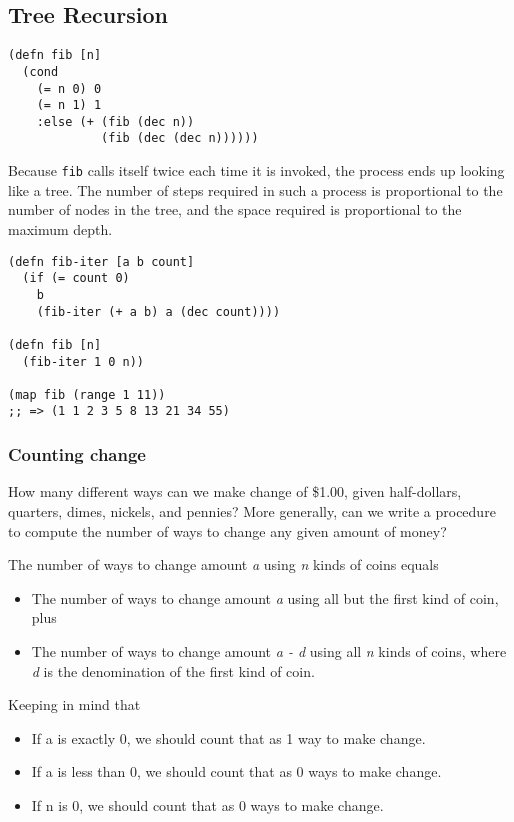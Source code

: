 \documentclass[11pt]{article}
\begin{document}
\subsection{Tree Recursion}
\label{sec-2-3}
\begin{verbatim}
(defn fib [n]
  (cond
    (= n 0) 0
    (= n 1) 1
    :else (+ (fib (dec n))
             (fib (dec (dec n))))))
\end{verbatim}

Because \texttt{fib} calls itself twice each time it is invoked, the process ends up looking like a tree. The number of steps required in such a process is proportional to the number of nodes in the tree, and the space required is proportional to the maximum depth.

\begin{verbatim}
(defn fib-iter [a b count]
  (if (= count 0)
    b
    (fib-iter (+ a b) a (dec count))))

(defn fib [n]
  (fib-iter 1 0 n))

(map fib (range 1 11))
;; => (1 1 2 3 5 8 13 21 34 55)
\end{verbatim}

\subsubsection{Counting change}
\label{sec-2-3-1}
How many different ways can we make change of \$1.00, given half-dollars, quarters, dimes, nickels, and pennies? More generally, can we write a procedure to compute the number of ways to change any given amount of money?

The number of ways to change amount \emph{a} using \emph{n} kinds of coins equals

\begin{itemize}
\item The number of ways to change amount \emph{a} using all but the first kind of coin, plus
\item The number of ways to change amount \emph{a - d} using all \emph{n} kinds of coins, where \emph{d} is the denomination of the first kind of coin.
\end{itemize}

Keeping in mind that

\begin{itemize}
\item If a is exactly 0, we should count that as 1 way to make change.
\item If a is less than 0, we should count that as 0 ways to make change.
\item If n is 0, we should count that as 0 ways to make change.
\end{itemize}
\end{document}
